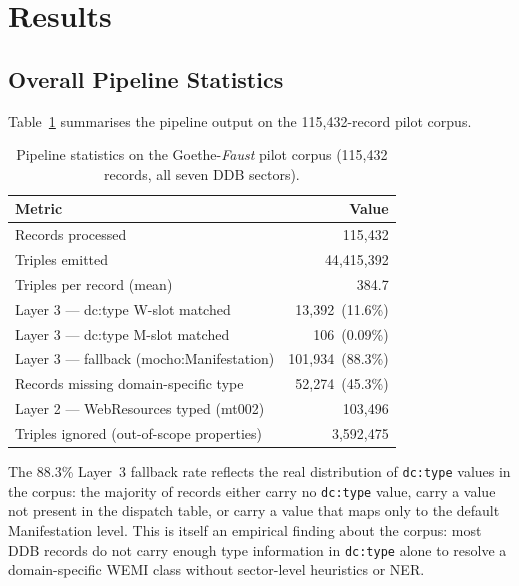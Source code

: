 
\section{Results}
\label{sec:results}

\subsection{Overall Pipeline Statistics}

Table~\ref{tab:stats} summarises the pipeline output on the 115{,}432-record
pilot corpus.

\begin{table}[t]
\caption{Pipeline statistics on the Goethe-\textit{Faust} pilot corpus
  (115{,}432 records, all seven DDB sectors).}
\label{tab:stats}
\centering
\begin{tabular}{lr}
\toprule
\textbf{Metric} & \textbf{Value} \\
\midrule
Records processed                         & 115{,}432 \\
Triples emitted                           & 44{,}415{,}392 \\
Triples per record (mean)                 & 384.7 \\
\midrule
Layer 3 — dc:type W-slot matched          & 13{,}392 \,(11.6\%) \\
Layer 3 — dc:type M-slot matched          & 106 \,(0.09\%) \\
Layer 3 — fallback (mocho:Manifestation)  & 101{,}934 \,(88.3\%) \\
Records missing domain-specific type      & 52{,}274 \,(45.3\%) \\
\midrule
Layer 2 — WebResources typed (mt002)      & 103{,}496 \\
\midrule
Triples ignored (out-of-scope properties) & 3{,}592{,}475 \\
\bottomrule
\end{tabular}
\end{table}

The 88.3\% Layer~3 fallback rate reflects the real distribution of
\texttt{dc:type} values in the corpus: the majority of records either carry
no \texttt{dc:type} value, carry a value not present in the dispatch table,
or carry a value that maps only to the default Manifestation level.
This is itself an empirical finding about the corpus: most DDB records do not
carry enough type information in \texttt{dc:type} alone to resolve a
domain-specific WEMI class without sector-level heuristics or NER.


